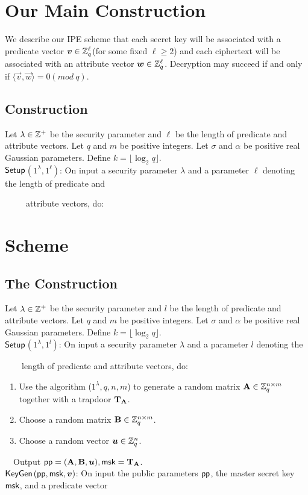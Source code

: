 
\section{Our Main Construction}
We describe our IPE scheme that each secret key will be associated with a predicate vector $\boldsymbol{v} \in \mathbb{Z}^{\ell}_{q}$(for some fixed $\ell\geq 2$) and each ciphertext will be associated with an attribute vector $\boldsymbol{w} \in \mathbb{Z}^{\ell}_{q}$. Decryption may succeed if and only if $\langle \vec{v},\vec{w} \rangle=0 (mod\ q)$.
\subsection{Construction}
Let $\lambda \in \mathbb{Z}^{+}$ be the security parameter and $\ell$ be the length of predicate and attribute vectors. Let $q$ and $m$ be positive integers. Let $\sigma$ and $\alpha$ be positive real Gaussian parameters. Define $k=\lfloor \log_{2}q\rfloor$. \\[0.6cm]
$\mathsf{Setup}$$(1^{\lambda},1^{\ell})$: On input a security parameter $\lambda$ and a parameter $\ell$ denoting the length of predicate and

~~~~~attribute vectors, do:
\section{Scheme}

\subsection{The Construction}
Let $\lambda \in \mathbb{Z}^{+}$ be the security parameter and $l$ be the length of predicate and attribute vectors. Let $q$ and $m$ be positive integers. Let $\sigma$ and $\alpha$ be positive real Gaussian parameters. Define $k=\lfloor \log_{2}q\rfloor$. \\[0.6cm]
$\mathsf{Setup}$$(1^{\lambda},1^{l})$: On input a security parameter $\lambda$ and a parameter $l$ denoting the

~~~~length of predicate and attribute vectors, do:
\begin{enumerate}
\item Use the algorithm \trapgen ($1^{\lambda},q,n,m$) to generate a random matrix $\textbf{A} \in \mathbb{Z}^{n \times m}_{q}$ together with a trapdoor $\mathbf{T}_{\mathbf{A}}$.\

\item Choose a random matrix $\mathbf{B} \in \mathbb{Z}^{n \times m}_{q}$.\

\item Choose a random vector $\boldsymbol{u} \in \mathbb{Z}^{n}_{q}$.
\end{enumerate}
~~Output $\mathsf{pp}=(\mathbf{A}, \mathbf{B}, \boldsymbol{u}),\mathsf{msk}=\mathbf{T}_{\mathbf{A}}$.\\[0.4cm]
$\mathsf{KeyGen}$$(\mathsf{pp},\mathsf{msk},\boldsymbol{v})$: On input the public parameters $\mathsf{pp}$, the master secret key $\mathsf{msk}$, and a predicate vector

